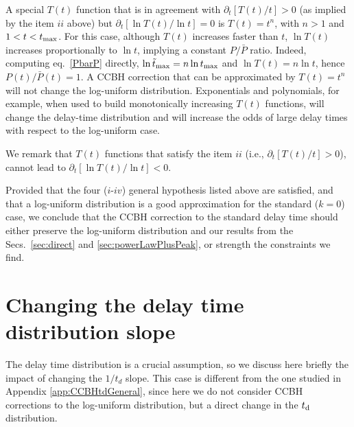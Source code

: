 \documentclass[fleqn,usenatbib,useAMS]{mnras}
\begin{document}
A special $T(t)$ function that is in agreement with $\partial_t [T(t)/t] > 0$ (as implied by the item $ii$ above) but $\partial_t [\ln T(t)/\ln t] = 0$ is $T(t) = t^n$, with $n > 1$ and $ 1 < t < t_{\rm max}$. For this case, although $T(t)$ increases faster than $t$, $\ln T(t)$ increases proportionally to $\ln t$, implying a constant $P/\bar P$ ratio. Indeed, computing eq.~\eqref{PbarP} directly,  $\ln \tilde t_{\rm max} = n \ln t_{\rm max} $  and $\ln  T (t)  = n \ln t $, hence ${P(t)}/{\bar P(t)} = 1$. A CCBH correction that can be approximated by $T(t) = t^n$ will not change the log-uniform distribution. Exponentials and polynomials, for example, when used to build monotonically increasing $T(t)$ functions, will change the delay-time distribution and will increase the odds of large delay times with respect to the log-uniform case.

We  remark that $T(t)$ functions that  satisfy the item $ii$ (i.e., $\partial_t [T(t)/t] > 0$), cannot lead to $\partial_t [\ln T(t)/ \ln t] < 0$. 

Provided that the four ($i$-$iv$) general hypothesis listed above are satisfied, and that a log-uniform distribution is a good approximation for the standard ($k=0$) case, we conclude that the CCBH correction to the standard delay time should either preserve the log-uniform distribution and our results from the Secs.~\ref{sec:direct} and \ref{sec:powerLawPlusPeak}, or strength the constraints we find. 

\bigskip 
\section{Changing the delay time distribution slope} \label{app:changing_td}

The delay time distribution is a crucial assumption, so we discuss here briefly the impact of changing the  $1/t_d$ slope. This case is different from the one studied in Appendix \ref{app:CCBHtdGeneral}, since here we do not consider CCBH corrections to the log-uniform distribution, but a direct change in the $t_{\rm d}$ distribution.
\end{document}
